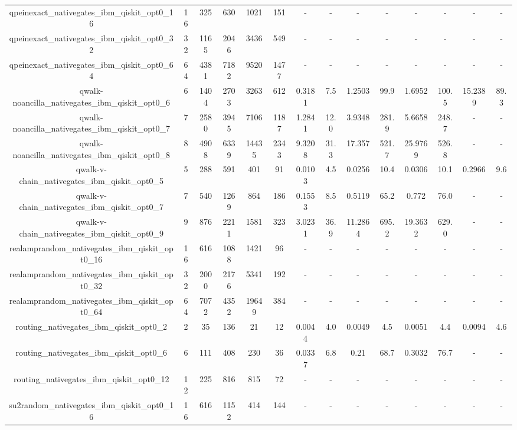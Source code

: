 \begin{table}[htb]
{\begin{tabular}{|c|c|c|c|c|c|c|c|c|c|c|c|c|c|}
qpeinexact\_nativegates\_ibm\_qiskit\_opt0\_16 & 16 & 325 & 630 & 1021 & 151 & - & - & - & - & - & - & - & - \\ 
qpeinexact\_nativegates\_ibm\_qiskit\_opt0\_32 & 32 & 1165 & 2046 & 3436 & 549 & - & - & - & - & - & - & - & - \\ 
qpeinexact\_nativegates\_ibm\_qiskit\_opt0\_64 & 64 & 4381 & 7182 & 9520 & 1477 & - & - & - & - & - & - & - & - \\ 
qwalk-noancilla\_nativegates\_ibm\_qiskit\_opt0\_6 & 6 & 1404 & 2703 & 3263 & 612 & 0.3181 & 7.5 & 1.2503 & 99.9 & 1.6952 & 100.5 & 15.2389 & 89.3 \\ 
qwalk-noancilla\_nativegates\_ibm\_qiskit\_opt0\_7 & 7 & 2580 & 3945 & 7106 & 1187 & 1.2841 & 12.0 & 3.9348 & 281.9 & 5.6658 & 248.7 & - & - \\ 
qwalk-noancilla\_nativegates\_ibm\_qiskit\_opt0\_8 & 8 & 4908 & 6339 & 14435 & 2343 & 9.3208 & 31.3 & 17.357 & 521.7 & 25.9769 & 526.8 & - & - \\ 
qwalk-v-chain\_nativegates\_ibm\_qiskit\_opt0\_5 & 5 & 288 & 591 & 401 & 91 & 0.0103 & 4.5 & 0.0256 & 10.4 & 0.0306 & 10.1 & 0.2966 & 9.6 \\ 
qwalk-v-chain\_nativegates\_ibm\_qiskit\_opt0\_7 & 7 & 540 & 1269 & 864 & 186 & 0.1553 & 8.5 & 0.5119 & 65.2 & 0.772 & 76.0 & - & - \\ 
qwalk-v-chain\_nativegates\_ibm\_qiskit\_opt0\_9 & 9 & 876 & 2211 & 1581 & 323 & 3.0231 & 36.9 & 11.2864 & 695.2 & 19.3632 & 629.0 & - & - \\ 
realamprandom\_nativegates\_ibm\_qiskit\_opt0\_16 & 16 & 616 & 1088 & 1421 & 96 & - & - & - & - & - & - & - & - \\ 
realamprandom\_nativegates\_ibm\_qiskit\_opt0\_32 & 32 & 2000 & 2176 & 5341 & 192 & - & - & - & - & - & - & - & - \\ 
realamprandom\_nativegates\_ibm\_qiskit\_opt0\_64 & 64 & 7072 & 4352 & 19649 & 384 & - & - & - & - & - & - & - & - \\ 
routing\_nativegates\_ibm\_qiskit\_opt0\_2 & 2 & 35 & 136 & 21 & 12 & 0.0044 & 4.0 & 0.0049 & 4.5 & 0.0051 & 4.4 & 0.0094 & 4.6 \\ 
routing\_nativegates\_ibm\_qiskit\_opt0\_6 & 6 & 111 & 408 & 230 & 36 & 0.0337 & 6.8 & 0.21 & 68.7 & 0.3032 & 76.7 & - & - \\ 
routing\_nativegates\_ibm\_qiskit\_opt0\_12 & 12 & 225 & 816 & 815 & 72 & - & - & - & - & - & - & - & - \\ 
su2random\_nativegates\_ibm\_qiskit\_opt0\_16 & 16 & 616 & 1152 & 414 & 144 & - & - & - & - & - & - & - & - \\ 

\end{tabular}}
\end{table}

